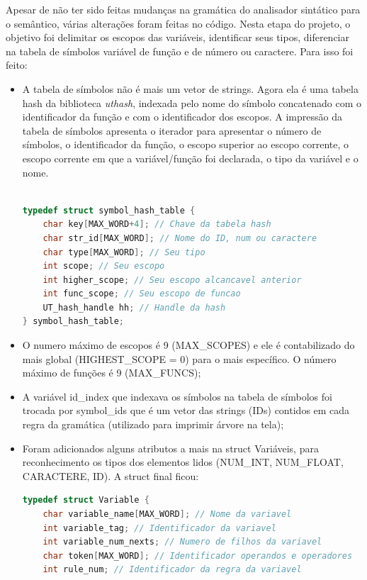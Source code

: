 \documentclass[12pt]{article}
\begin{document}
\indent Apesar de não ter sido feitas mudanças na gramática do analisador sintático para o semântico, várias alterações foram feitas no código. Nesta etapa do projeto, o objetivo foi delimitar os escopos das variáveis, identificar seus tipos, diferenciar na tabela de símbolos variável de função e de número ou caractere. Para isso foi feito:

\begin{itemize}
\item A tabela de símbolos não é mais um vetor de strings. Agora ela é uma tabela hash da biblioteca \textit{uthash}, indexada pelo nome do símbolo concatenado com o identificador da função e com o identificador dos escopos. A impressão da tabela de símbolos apresenta o iterador para apresentar o número de símbolos, o identificador da função, o escopo superior ao escopo corrente, o escopo corrente em que a variável/função foi declarada, o tipo da variável e o nome. \\

\begin{lstlisting}[language=C]

typedef struct symbol_hash_table {
    char key[MAX_WORD+4]; // Chave da tabela hash
    char str_id[MAX_WORD]; // Nome do ID, num ou caractere
    char type[MAX_WORD]; // Seu tipo 
    int scope; // Seu escopo
    int higher_scope; // Seu escopo alcancavel anterior
    int func_scope; // Seu escopo de funcao
    UT_hash_handle hh; // Handle da hash
} symbol_hash_table;

\end{lstlisting}

\item O numero máximo de escopos é 9 (MAX\_SCOPES) e ele é contabilizado do mais global (HIGHEST\_SCOPE = 0) para o mais específico. O número máximo de funções é 9 (MAX\_FUNCS);

\item A variável id\_index que indexava os símbolos na tabela de símbolos foi trocada por symbol\_ids que é um vetor das strings (IDs) contidos em cada regra da gramática (utilizado para imprimir árvore na tela);

\item Foram adicionados alguns atributos a mais na struct Variáveis, para reconhecimento os tipos dos elementos lidos (NUM\_INT, NUM\_FLOAT, CARACTERE, ID). A struct final ficou: \\
\begin{lstlisting}[language=C]
typedef struct Variable {
    char variable_name[MAX_WORD]; // Nome da variavel
    int variable_tag; // Identificador da variavel
    int variable_num_nexts; // Numero de filhos da variavel
    char token[MAX_WORD]; // Identificador operandos e operadores
    int rule_num; // Identificador da regra da variavel
    

\end{lstlisting}
\end{itemize}
\end{document}
